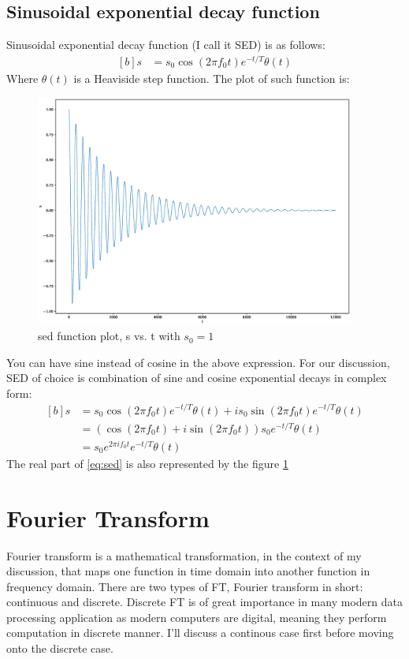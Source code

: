 \documentclass[letterpaper, 11pt]{article}
\newcommand{\sed}[1]{s_{0}e^{2\pi if_{0}#1}e^{-#1/T}} %
\numberwithin{equation}{section}
\numberwithin{figure}{section}
\begin{document}
\subsection{Sinusoidal exponential decay function}
Sinusoidal exponential decay function (I call it SED) is as follows:
\begin{equation}
	\begin{aligned}[b]
		s &= s_{0}\cos{(2\pi f_{0}t)}e^{-t/T} \theta(t)
	\end{aligned}
\end{equation}
Where \(\theta (t)\) is a Heaviside step function. The plot of such function is:
\begin{figure}[H]
	\centering
	\includegraphics[height=3in]{sed.eps}
	\caption[Optional caption]{sed function plot, s vs. t with \(s_{0} = 1\)}
	\label{fig1}
\end{figure}
You can have sine instead of cosine in the above expression. For our discussion, SED of choice is combination of sine and cosine exponential decays in complex form:
\begin{equation}
	\begin{aligned}[b]
		s	&= s_{0}\cos{(2\pi f_{0}t)}e^{-t/T} \theta(t)+ i s_{0}\sin{(2\pi f_{0}t)}e^{-t/T} \theta(t)\\
			&= (\cos{(2\pi f_{0}t)} +i \sin{(2\pi f_{0}t)})s_{0}e^{-t/T} \theta(t) \\
			&= \sed{t} \theta (t)
			\label{eq:sed}
	\end{aligned}
\end{equation}
The real part of \eqref{eq:sed} is also represented by the figure \ref{fig1} 
\clearpage

\section{Fourier Transform}
Fourier transform is a mathematical transformation, in the context of my discussion, that maps one function in time domain into another function in frequency domain. There are two types of FT, Fourier transform in short: continuous and discrete. Discrete FT is of great importance in many modern data processing application as modern computers are digital, meaning they perform computation in discrete manner. I'll discuss a continous case first before moving onto the discrete case.
\end{document}
